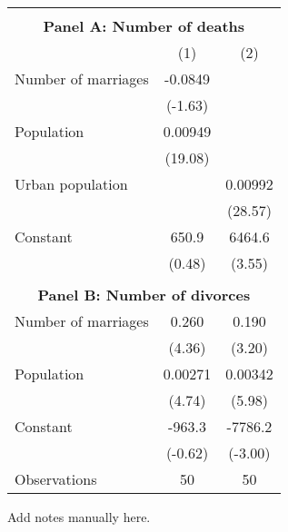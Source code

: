\begin{tabular}{l*{2}{c}} \hline\hline
\\ \multicolumn{3}{c}{\textbf{Panel A: Number of deaths}} \\[-1ex]
                    &\multicolumn{1}{c}{(1)}         &\multicolumn{1}{c}{(2)}         \\
\hline
Number of marriages &     -0.0849         &                     \\
                    &     (-1.63)         &                     \\
[1em]
Population          &     0.00949\sym{***}&                     \\
                    &     (19.08)         &                     \\
[1em]
Urban population    &                     &     0.00992\sym{***}\\
                    &                     &     (28.57)         \\
[1em]
Constant            &       650.9         &      6464.6\sym{***}\\
                    &      (0.48)         &      (3.55)         \\
\\ \multicolumn{3}{c}{\textbf{Panel B: Number of divorces}} \\[-1ex]
[1em]
Number of marriages &       0.260\sym{***}&       0.190\sym{**} \\
                    &      (4.36)         &      (3.20)         \\
[1em]
Population          &     0.00271\sym{***}&     0.00342\sym{***}\\
                    &      (4.74)         &      (5.98)         \\
[1em]
Constant            &      -963.3         &     -7786.2\sym{**} \\
                    &     (-0.62)         &     (-3.00)         \\
\hline
Observations        &          50         &          50         \\
\hline\hline \end{tabular} \begin{tablenotes} \footnotesize \item Add notes manually here. \end{tablenotes}
